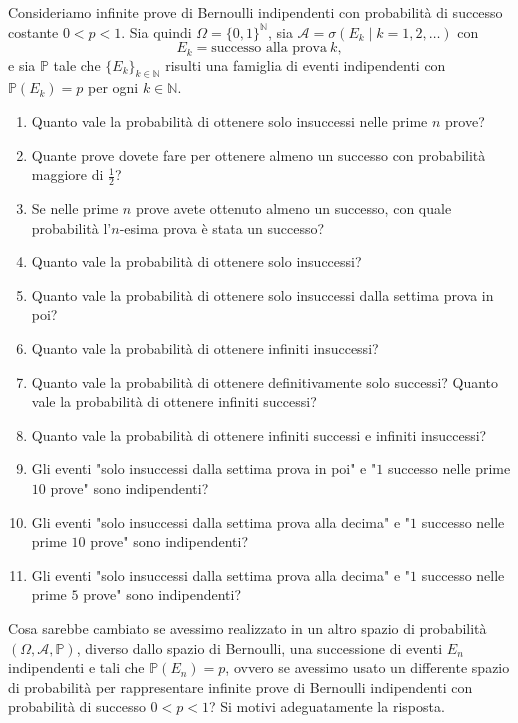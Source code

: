 Consideriamo infinite prove di Bernoulli indipendenti con probabilità di successo costante $0< p< 1$. Sia quindi $\Omega =\{0,1\}^{\mathbb{N}}$, sia $\mathcal{A} =\sigma ( E_{k} \mid k=1,2,\dots )$ con
\begin{equation*}
E_{k} =\text{successo alla prova} \ k,
\end{equation*}
e sia $\mathbb{P}$ tale che $\{E_{k}\}_{k\in \mathbb{N}}$ risulti una famiglia di eventi indipendenti con $\mathbb{P}( E_{k}) =p$ per ogni $k\in \mathbb{N}$.
\begin{enumerate}
\item Quanto vale la probabilità di ottenere solo insuccessi nelle prime $n$ prove?
\item Quante prove dovete fare per ottenere almeno un successo con probabilità maggiore di $\frac{1}{2}$?
\item Se nelle prime $n$ prove avete ottenuto almeno un successo, con quale probabilità l'$n$-esima prova è stata un successo?
\item Quanto vale la probabilità di ottenere solo insuccessi?
\item Quanto vale la probabilità di ottenere solo insuccessi dalla settima prova in poi?
\item Quanto vale la probabilità di ottenere infiniti insuccessi?
\item Quanto vale la probabilità di ottenere definitivamente solo successi? Quanto vale la probabilità di ottenere infiniti successi?
\item Quanto vale la probabilità di ottenere infiniti successi e infiniti insuccessi?
\item Gli eventi "solo insuccessi dalla settima prova in poi" e "$1$ successo nelle prime $10$ prove" sono indipendenti?
\item Gli eventi "solo insuccessi dalla settima prova alla decima" e "$1$ successo nelle prime $10$ prove" sono indipendenti?
\item Gli eventi "solo insuccessi dalla settima prova alla decima" e "$1$ successo nelle prime $5$ prove" sono indipendenti?
\end{enumerate}

Cosa sarebbe cambiato se avessimo realizzato in un altro spazio di probabilità $( \Omega ,\mathcal{A} ,\mathbb{P})$, diverso dallo spazio di Bernoulli, una successione di eventi $E_{n}$ indipendenti e tali che $\mathbb{P}( E_{n}) =p$, ovvero se avessimo usato un differente spazio di probabilità per rappresentare infinite prove di Bernoulli indipendenti con probabilità di successo $0< p< 1$? Si motivi adeguatamente la risposta.

